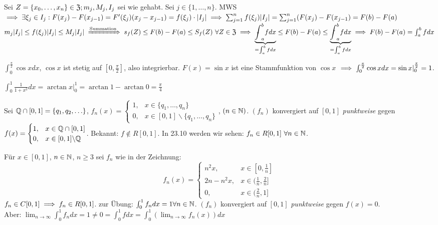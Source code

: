 \documentclass[a4paper,oneside,DIV15,BCOR12mm]{scrbook}
\begin{document}
\begin{beweis}
Sei $Z=\{x_0,\ldots,x_n\} \in \mathfrak{Z}; m_j, M_j, I_j$ sei wie gehabt. Sei $j\in\{1,\ldots,n\}$. MWS $\implies \exists \xi_j \in I_j: F(x_j)-F(x_{j-1}) = F'(\xi_j)(x_j-x_{j-1}) = f(\xi_j)\cdot|I_j| \implies \sum_{j=1}^nf(\xi_j)|I_j| = \sum _{j=1}^n(F(x_j) - F(x_{j-1}) = F(b) - F(a)$ \\
$m_j|I_j|\le f(\xi_j)|I_j| \le M_j|I_j| \folgtnach{Summation} s_f(Z)\le F(b) - F(a) \le S_f(Z) \ \forall Z\in\Z \folgt \underbrace{\uint_a^bfdx}_{=\int_a^bfdx} \le F(b) - F(a) \le \underbrace{\oint_a^bfdx}_{=\int_a^bfdx} \folgt F(b) - F(a) = \int_a^bfdx$
\end{beweis}

\begin{beispiele}
\item $\int_0^{\frac{\pi}{2}}\cos xdx$, $\cos x$ ist stetig auf $[0,\frac{\pi}{2}]$, also integrierbar. $F(x) = \sin x$ ist eine Stammfunktion von $\cos x$ $\implies \int_0^{\frac{\pi}{2}}\cos xdx = \sin x|_0^{\frac{\pi}{2}} = 1$.
\item $\int_0^1\frac{1}{1+x^2}dx = \arctan x|_0^1 = \arctan 1 - \arctan 0 = \frac{\pi}{4}$
\end{beispiele}

\begin{beispiele}
\item Sei $\mathbb{Q}\cap[0,1] = \{q_1, q_2, \ldots \}$, $f_n(x) = \begin{cases} 1, & x\in\{q_1,\ldots,q_n\} \\ 0, & x\in[0,1]\backslash\{q_1,\ldots,q_n\} \end{cases}$, $(n\in\mathbb{N})$. $(f_n)$ konvergiert auf $[0,1]$ \emph{punktweise} gegen $f(x) = \begin{cases} 1, & x\in \mathbb{Q} \cap [0,1] \\ 0, & x \in [0,1]\backslash \mathbb{Q} \end{cases}$. Bekannt: $f \notin R[0,1]$. In 23.10 werden wir sehen: $f_n\in R[0,1] \ \forall n\in\MdN$.
\item Für $x\in[0,1]$, $n\in\mathbb{N}$, $n\ge 3$ sei $f_n$ wie in der Zeichnung:
$$f_n(x) = \begin{cases} n^2 x,& x\in[0,\frac{1}{n}] \\ 2n - n^2 x, & x\in(\frac{1}{n},\frac{2}{n}] \\ 0, & x \in (\frac{2}{n},1]\end{cases}$$
$f_n \in C[0,1] \implies f_n \in R[0,1]$. zur Übung: $\int_0^1f_ndx = 1 \forall n\in\mathbb{N}$. $(f_n)$ konvergiert auf $[0,1]$ \emph{punktweise} gegen $f(x)= 0$. \\
Aber: $\lim_{n\to\infty}\int_0^1f_ndx = 1 \ne 0 = \int_0^1fdx = \int_0^1(\lim_{n\to\infty} f_n(x)) dx $
\end{beispiele}
\end{document}
